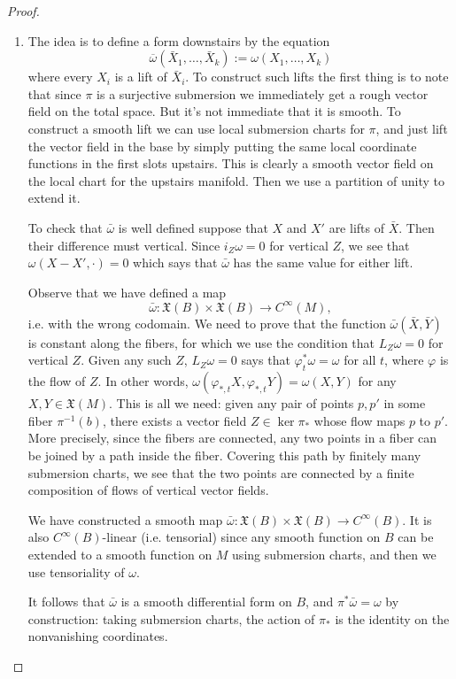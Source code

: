 \begin{proof}
\begin{enumerate}
\item The idea is to define a form 
downstairs by the equation
$$
\overline{\omega}(\bar{X}_1,\dots,\bar{X}_k)
:=\omega(X_1,\dots,X_k)
$$
where every $X_i$ is a lift of $\bar{X}_i$.
To construct such lifts the first thing
is to note that since $\pi$ is a surjective
submersion we immediately get a 
rough vector field on the total space.
But it's not immediate that it is smooth.
To construct a smooth lift we can use
local submersion charts for $\pi$,
and just lift the vector field in
the base by simply putting the same
local coordinate functions in the first
slots upstairs. This is clearly a smooth
vector field on the local chart for
the upstairs manifold.
Then we use a partition of unity to extend
it.

To check that $\bar{\omega}$ is well
defined suppose that $X$ and $X'$
are lifts of $\bar{X}$. Then their
difference must vertical. Since $i_Z\omega=0$
for vertical $Z$, we see that
$\omega(X-X',\cdot)=0$ which says
that $\bar{\omega}$ has the same value
for either lift.

Observe that we have defined a map
$$
\bar{\omega} : 
\mathfrak{X}(B) \times \mathfrak{X}(B)
\longrightarrow C^\infty(M),
$$
i.e. with the wrong codomain.
We need to prove that the function
$\bar{\omega}(\bar{X},\bar{Y})$
is constant along the fibers,
for which we use
the condition that $L_Z\omega =0$
for vertical $Z$.
Given any such $Z$, $L_Z\omega=0$
says that $\varphi^*_t\omega=\omega$
for all $t$, where $\varphi$ is
the flow of $Z$.
In other words,
$\omega(\varphi_{*,t}X,\varphi_{*,t}Y)
=\omega(X,Y)$
for any $X,Y \in \mathfrak{X}(M)$.
This is all we need:
given any pair of points $p,p'$ 
in some fiber $\pi^{-1}(b)$,
there exists a vector field $Z \in\ker\pi_*$
whose flow maps $p$ to $p'$.
More precisely,
since the fibers are connected, 
any two points
in a fiber can be joined by 
a path inside the
fiber. Covering this path by finitely many
submersion charts, we see that the two points
are connected by a finite composition 
of flows of vertical vector fields.

We have constructed a smooth map
$\bar{\omega}:\mathfrak{X}(B)\times
\mathfrak{X}(B) \to C^\infty(B)$.
It is also $C^\infty(B)$-linear
(i.e. tensorial) since
any smooth function on $B$ can be
extended to a smooth function on $M$
using submersion charts, and then
we use tensoriality of $\omega$.

It follows that $\bar{\omega}$ is
a smooth differential form on $B$,
and $\pi^* \bar{\omega}=\omega$
by construction:
taking submersion charts,
the action of $\pi_*$ is the identity
on the nonvanishing coordinates.


\end{enumerate}
\end{proof}
